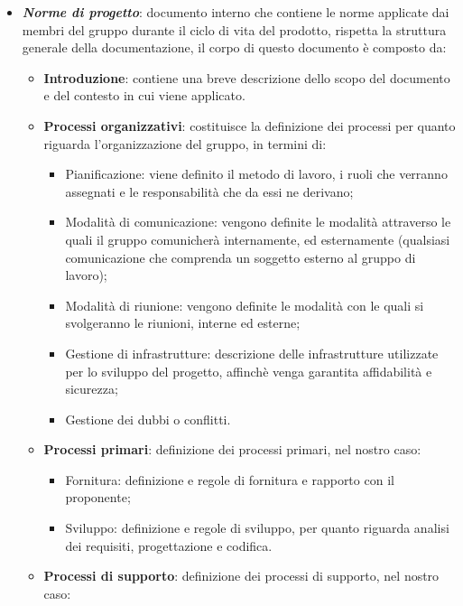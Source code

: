 \begin{itemize}
        \item \textit{\textbf{Norme di progetto}}: documento interno che contiene le norme applicate dai membri del gruppo durante il ciclo di vita del prodotto, rispetta la struttura generale della documentazione, il corpo di questo documento è composto da:
        \begin{itemize}
            \item \textbf{Introduzione}: contiene una breve descrizione dello scopo del documento e del contesto in cui viene applicato.
            \item \textbf{Processi organizzativi}: costituisce la definizione dei processi per quanto riguarda l'organizzazione del gruppo, in termini di:
            \begin{itemize}
                \item Pianificazione: viene definito il metodo di lavoro, i ruoli che verranno assegnati e le responsabilità che da essi ne derivano;
                \item Modalità di comunicazione: vengono definite le modalità attraverso le quali il gruppo comunicherà internamente, ed esternamente (qualsiasi comunicazione che comprenda un soggetto esterno al gruppo di lavoro);
                \item Modalità di riunione: vengono definite le modalità con le quali si svolgeranno le riunioni, interne ed esterne;
                \item Gestione di infrastrutture: descrizione delle infrastrutture utilizzate per lo sviluppo del progetto, affinchè venga garantita affidabilità e sicurezza;
                \item Gestione dei dubbi o conflitti.
            \end{itemize}
            \item \textbf{Processi primari}: definizione dei processi primari, nel nostro caso:
            \begin{itemize}
                \item Fornitura: definizione e regole di fornitura e rapporto con il proponente;
                \item Sviluppo: definizione e regole di sviluppo, per quanto riguarda analisi dei requisiti, progettazione e codifica.
            \end{itemize}
            \item \textbf{Processi di supporto}: definizione dei processi di supporto, nel nostro caso:
            \begin{itemize}

\end{itemize}
\end{itemize}
\end{itemize}
